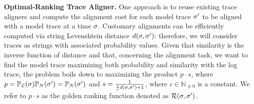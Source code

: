 \smallskip
\noindent
\textbf{Optimal-Ranking Trace Aligner.}
One approach is to reuse existing trace aligners and compute the alignment cost for each model trace ${\sigma'}$ to be aligned with a model trace at a time $\sigma$. Customary alignments \cite{DBLP:conf/edoc/AdriansyahDA11,LeoniM17} can be efficiently computed via string Levenshtein distance $d(\sigma,{\sigma'})$: therefore, we will consider traces as strings with associated probability values. Given that similarity is the inverse function of distance and that, concerning the alignment task, we want to find the model trace maximizing both probability and similarity with the log trace, the problem boils down to maximizing the product $p\cdot s$, where $p=\mathbb{P}_{\mathcal{L}}(\sigma)\mathbb{P}_{N}({\sigma'})=\mathbb{P}_{N}({\sigma'})$ and $s=\frac{1}{\frac{1}{c}d(\sigma, {\sigma'})+1}$, where $c\in\mathbb{N}_{\neq 0}$ is a constant. We refer to $p\cdot s$ as the golden ranking function denoted as $\mathcal{R}(\sigma,{\sigma'})$.


%
%


